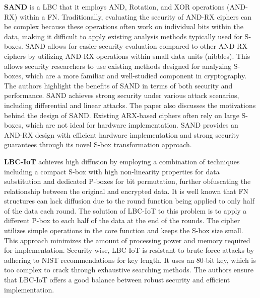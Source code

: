 \documentclass[conference]{IEEEtran}
\begin{document}
\textbf{SAND} is a LBC that it employs AND, Rotation, and XOR operations (AND-RX) within a FN. Traditionally, evaluating the security of AND-RX ciphers can be complex because these operations often work on individual bits within the data, making it difficult to apply existing analysis methods typically used for S-boxes. SAND allows for easier security evaluation compared to other AND-RX ciphers by utilizing AND-RX operations within small data units (nibbles). This allows security researchers to use existing methods designed for analyzing S-boxes, which are a more familiar and well-studied component in cryptography. The authors highlight the benefits of SAND in terms of both security and performance. SAND achieves strong security under various attack scenarios, including differential and linear attacks. The paper also discusses the motivations behind the design of SAND. Existing ARX-based ciphers often rely on large S-boxes, which are not ideal for hardware implementation. SAND provides an AND-RX design with efficient hardware implementation and strong security guarantees through its novel S-box transformation approach\cite{SAND}.


\textbf{LBC-IoT} achieves high diffusion by employing a combination of techniques including a compact S-box with high non-linearity properties for data substitution and dedicated P-boxes for bit permutation, further obfuscating the relationship between the original and encrypted data. It is well known that FN structures can lack diffusion due to the round function being applied to only half of the data each round. The solution of LBC-IoT to this problem is to apply a different P-box to each half of the data at the end of the rounds. The cipher utilizes simple operations in the core function and keeps the S-box size small. This approach minimizes the amount of processing power and memory required for implementation. Security-wise, LBC-IoT is resistant to brute-force attacks by adhering to NIST recommendations for key length. It uses an 80-bit key, which is too complex to crack through exhaustive searching methods. The authors ensure that LBC-IoT offers a good balance between robust security and efficient implementation\cite{LBC-IoT}.
\end{document}
